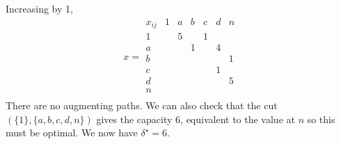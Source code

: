 \begin{example}
	Increasing by 1,
	\[
		x = \begin{array}{c|cccccc}
			x_{ij} & 1 & a & b & c & d & n \\\hline
			1      &   & 5 &   & 1 &   &   \\
			a      &   &   & 1 &   & 4 &   \\
			b      &   &   &   &   &   & 1 \\
			c      &   &   &   &   & 1 &   \\
			d      &   &   &   &   &   & 5 \\
			n                              \\
		\end{array}
	\]
	There are no augmenting paths.
	We can also check that the cut \( (\{ 1 \}, \{ a,b,c,d,n \}) \) gives the capacity 6, equivalent to the value at \( n \) so this must be optimal.
	We now have \( \delta^\star = 6 \).
\end{example}

